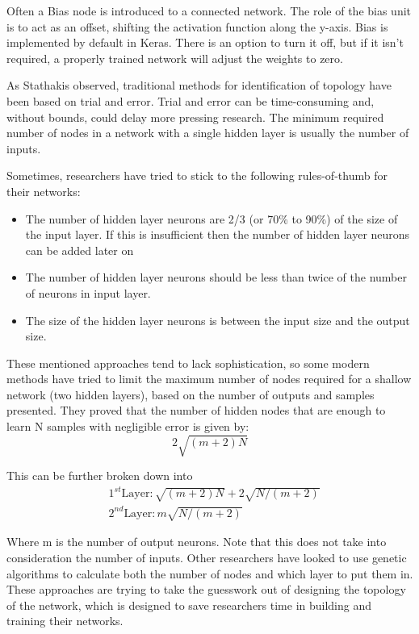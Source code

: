 Often a Bias node is introduced to a connected network. The role of the bias unit is to act as an offset\cite{intro_ml}, shifting the activation function along the y-axis. Bias is implemented by default in Keras. There is an option to turn it off, but if it isn't required, a properly trained network will adjust the weights to zero.

As Stathakis observed\cite{hidden_layers}, traditional methods for identification of topology have been based on trial and error. Trial and error can be time-consuming and, without bounds, could delay more pressing research. The minimum required number of nodes in a network with a single hidden layer is usually the number of inputs\cite{Goodfellow_deeplearning}.

Sometimes, researchers have tried to stick to the following rules-of-thumb for their networks\cite{Saurabh_approx}:
\begin{itemize}
\item The number of hidden layer neurons are 2/3 (or 70\% to 90\%) of the size of the input layer. If this is insufficient then the number of hidden layer neurons can be added later on
\item The number of hidden layer neurons should be less than twice of the number of neurons in input layer.
\item The size of the hidden layer neurons is between the input size and the output size.
\end{itemize}

These mentioned approaches tend to lack sophistication, so some modern methods\cite{huang_two_layer} have tried to limit the maximum number of nodes required for a shallow network (two hidden layers), based on the number of outputs and samples presented. They proved that the number of hidden nodes that are enough to learn N samples with negligible error is given by:
\begin{equation}
    2\sqrt{\left(m+2\right)N} \label{eq:max_neurons}
\end{equation}

This can be further broken down into 
\begin{align}
    &1^{st} \text{Layer}: \sqrt{\left(m+2\right)N} + 2\sqrt{N/\left(m+2\right)} \label{eq:first_layer} \\
    &2^{nd} \text{Layer}: m\sqrt{N/\left(m+2\right)} \label{eq:second_layer}
\end{align}

Where m is the number of output neurons. Note that this does not take into consideration the number of inputs.
Other researchers have looked to use genetic algorithms\cite{learning_algorithm}\cite{hidden_layers} to calculate both the number of nodes and which layer to put them in. These approaches are trying to take the guesswork out of designing the topology of the network, which is designed to save researchers time in building and training their networks.

